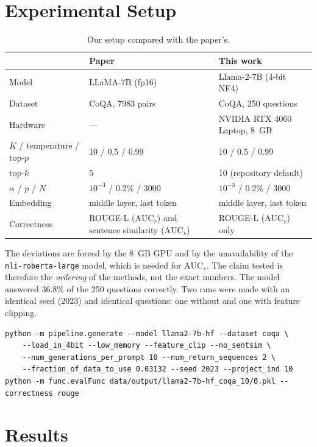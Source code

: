 \documentclass[conference]{IEEEtran}
\begin{document}
\section{Experimental Setup}
\begin{table}[t]
\centering\small
\caption{Our setup compared with the paper's.}
\begin{tabular}{@{}p{1.6cm}p{2.9cm}p{3.0cm}@{}}
\toprule
 & Paper & This work\\
\midrule
Model & LLaMA-7B (fp16) & Llama-2-7B (4-bit NF4)\\
Dataset & CoQA, 7983 pairs & CoQA, 250 questions\\
Hardware & --- & NVIDIA RTX 4060 Laptop, 8~GB\\
$K$ / temperature / top-$p$ & 10 / 0.5 / 0.99 & 10 / 0.5 / 0.99\\
top-$k$ & 5 & 10 (repository default)\\
$\alpha$ / $p$ / $N$ & $10^{-3}$ / 0.2\% / 3000 & $10^{-3}$ / 0.2\% / 3000\\
Embedding & middle layer, last token & middle layer, last token\\
Correctness & ROUGE-L ($\mathrm{AUC}_r$) and sentence similarity ($\mathrm{AUC}_s$) & ROUGE-L ($\mathrm{AUC}_r$) only\\
\bottomrule
\end{tabular}
\end{table}
The deviations are forced by the 8~GB GPU and by the unavailability of the \texttt{nli-roberta-large} model, which is needed for $\mathrm{AUC}_s$. The claim tested is therefore the \emph{ordering} of the methods, not the exact numbers. The model answered 36.8\% of the 250 questions correctly. Two runs were made with an identical seed (2023) and identical questions: one without and one with feature clipping.

\begin{lstlisting}
python -m pipeline.generate --model llama2-7b-hf --dataset coqa \
    --load_in_4bit --low_memory --feature_clip --no_sentsim \
    --num_generations_per_prompt 10 --num_return_sequences 2 \
    --fraction_of_data_to_use 0.03132 --seed 2023 --project_ind 10
python -m func.evalFunc data/output/llama2-7b-hf_coqa_10/0.pkl --correctness rouge
\end{lstlisting}

\section{Results}
\end{document}
